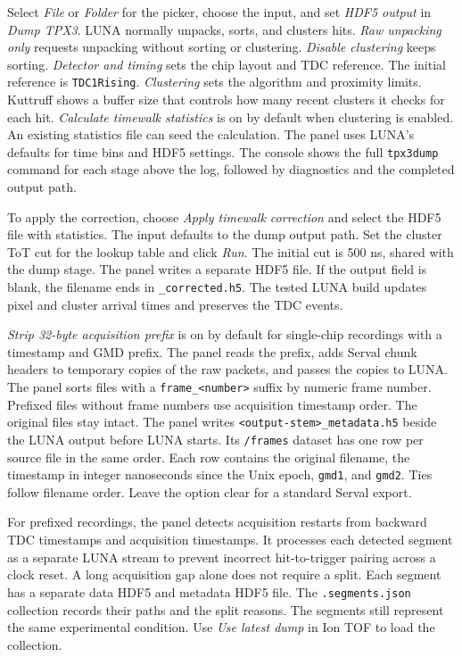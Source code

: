 \documentclass[11pt,a4paper]{article}
\newcommand{\code}[1]{\texttt{#1}}
\begin{document}
Select \emph{File} or \emph{Folder} for the picker, choose the input, and
set \emph{HDF5 output} in \emph{Dump TPX3}. LUNA normally unpacks, sorts,
and clusters hits.
\emph{Raw unpacking only} requests unpacking without sorting or clustering.
\emph{Disable clustering} keeps sorting. \emph{Detector and timing} sets the
chip layout and TDC reference. The initial reference is \code{TDC1Rising}.
\emph{Clustering} sets the algorithm and proximity limits. Kuttruff shows a
buffer size that controls how many recent clusters it checks for each hit.
\emph{Calculate timewalk statistics} is on by default when clustering is
enabled. An existing statistics file can seed the calculation. The panel
uses LUNA's defaults for time bins and HDF5 settings. The console shows the
full \code{tpx3dump} command for each stage above the log, followed by
diagnostics and the completed output path.

To apply the correction, choose \emph{Apply timewalk correction} and select
the HDF5 file with statistics. The input defaults to the dump output path.
Set the cluster ToT cut for the lookup table and click \emph{Run}. The initial
cut is 500 ns, shared with the dump stage. The panel
writes a separate HDF5 file. If the output field is blank, the filename
ends in \code{\_corrected.h5}. The tested LUNA build updates pixel and
cluster arrival times and preserves the TDC events.

\emph{Strip 32-byte acquisition prefix} is on by default for single-chip
recordings with a timestamp and GMD prefix. The panel reads the prefix,
adds Serval chunk headers to temporary copies of the raw packets, and passes
the copies to LUNA. The panel sorts files with a \code{frame\_<number>}
suffix by numeric frame number. Prefixed files without frame numbers use
acquisition timestamp order. The original files stay intact. The panel writes
\code{<output-stem>\_metadata.h5} beside the LUNA output before LUNA starts.
Its \code{/frames} dataset has one row per source file in the same order.
Each row contains the original
filename, the timestamp in integer nanoseconds since the Unix epoch,
\code{gmd1}, and \code{gmd2}. Ties follow filename order.
Leave the option clear for a standard Serval export.

For prefixed recordings, the panel detects acquisition restarts from backward
TDC timestamps and acquisition timestamps. It processes each detected segment
as a separate LUNA stream to prevent incorrect hit-to-trigger pairing across
a clock reset. A long acquisition gap alone does not require a split.
Each segment has a separate data HDF5 and metadata HDF5 file. The
\code{.segments.json} collection records their paths and the split reasons.
The segments still represent the same experimental condition. Use
\emph{Use latest dump} in Ion TOF to load the collection.
\end{document}
